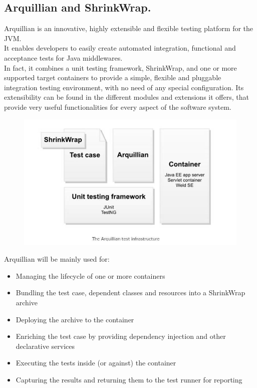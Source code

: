 \documentclass[18pt,oneside,a4paper, titlepage]{article}
\begin{document}
	\subsection{Arquillian and ShrinkWrap.}
		Arquillian is an innovative, highly extensible and flexible testing platform for the JVM.\\ It enables developers to easily create automated integration, functional and acceptance tests for Java middlewares. \\In fact, it combines a unit testing framework, ShrinkWrap, and one or more supported target containers to provide a simple, flexible and pluggable integration testing environment, with no need of any special configuration.
	\newpage
	\noindent
		Its extensibility can be found in the different modules and extensions it offers, that provide very useful functionalities for every aspect of the software system.
		\vspace{0.5cm}
		\begin{figure}[h]
			\centering
			\includegraphics[scale=0.45]{Arquillian.jpg}
		\end{figure}
			
		\vspace{0.5cm}
	
		Arquillian will be mainly used for:
		\begin{itemize}
			\item Managing the lifecycle of one or more containers
			\item Bundling the test case, dependent classes and resources into a ShrinkWrap archive
			\item Deploying the archive to the container
			\item Enriching the test case by providing dependency injection and other declarative services
			\item Executing the tests inside (or against) the container
			\item Capturing the results and returning them to the test runner for reporting
		\end{itemize}
		
\end{document}
